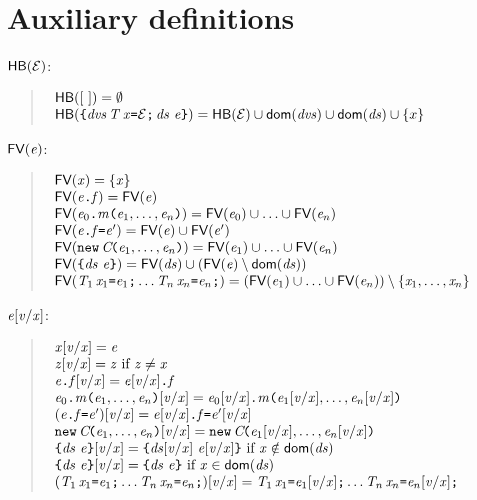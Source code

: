  \appendix
\section{Auxiliary definitions}
\begin{small}
\noindent $\HB{\ctx}$:
\begin{quote}
$
\begin{array}{l}
\HB{\emptyctx}=\emptyset\\
{\HB{\Block{\dvs\,\Dec{\T}{\x}{\ctx}\,\decs}{\e}}=\HB{\ctx}\cup\dom{\dvs}\cup\dom{\decs}}\cup\{x\}\\
\end{array}
$
\end{quote}
\noindent
$\FV{\e}$:
\begin{quote}
$
\begin{array}{l}
\FV{\x}=\{\x\}\\
\FV{\FieldAccess{\e}{\f}}=\FV{\e}\\
\FV{\MethCall{\e_0}{\m}{\e_1,\ldots,\e_n}}=\FV{\e_0}\cup\ldots\cup\FV{\e_n}\\
\FV{\FieldAssign{\e}{\f}{\e'}}=\FV{\e}\cup\FV{\e'}\\
\FV{\ConstrCall{\C}{\e_1,\ldots,\e_n}}=\FV{\e_1}\cup\ldots\cup\FV{\e_n}\\
\FV{\Block\decs{\e}}=\FV{\decs}\cup(\FV{\e}\setminus\dom\decs)\\
\FV{\Dec{\T_1}{\x_1}{\e_1}\ldots\Dec{\T_n}{\x_n}{\e_n}}=
(\FV{\e_1}\cup\ldots\cup\FV{\e_n})\setminus\{\x_1,\ldots,\x_n\}
\end{array}
$
\end{quote}


\noindent
$\Subst{\e}{\val}{\x}$:
\begin{quote}
$
\begin{array}{l}
\Subst{\x}{\val}{\x}=\e\\
\Subst{\z}{\val}{\x}=\z\ \mbox{if}\ \z\neq\x\\
\Subst{\FieldAccess{\e}{\f}}{\val}{\x}=
\FieldAccess{\Subst{\e}{\val}{\x}}{\f}
\\
\Subst{\MethCall{\e_0}{\m}{\e_1,\ldots,\e_n}}{\val}{\x}=
\MethCall{\Subst{\e_0}{\val}{\x}}{\m}{\Subst{\e_1}{\val}{\x},\ldots,\Subst{\e_n}{\val}{\x}}
\\
\Subst{(\FieldAssign{\e}{\f}{\e'})}{\val}{\x}=
\FieldAssign{\Subst{\e}{\val}{\x}}{\f}{\Subst{\e'}{\val}{\x}}
\\
\Subst{\ConstrCall{\C}{\e_1,\ldots,\e_n}}{\val}{\x}=
\ConstrCall{\C}{\Subst{\e_1}{\val}{\x},\ldots,\Subst{\e_n}{\val}{\x}}\\
\Subst{\Block{\decs}{\e}}{\val}{\x}=
\Block{\Subst{\decs}{\val}{\x}}{\Subst\e{\val}{\x}}
\mbox{ if }\x\notin\dom\decs
\\
\Subst{\Block\decs{\e}}{\val}{\x}=
\Block\decs{\e}
\mbox{ if }\x\in\dom\decs\\
{\Subst{(\Dec{{\T}_1}{\x_1}{\e_1}\ldots\Dec{{\T}_n}{\x_n}{\e_n})}{\val}{\x}=
\Dec{{\T}_1}{\x_1}{\Subst{\e_1}{\val}{\x}}\ldots\Dec{{\T}_n}{\x_n}{\Subst{\e_n}{\val}{\x}}}
\end{array}
$
\end{quote}
\end{small}

